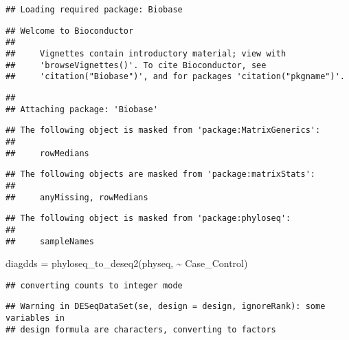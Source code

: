 \documentclass[
]{article}
\newenvironment{Shaded}{\begin{snugshade}}{\end{snugshade}}
\newcommand{\FunctionTok}[1]{\textcolor[rgb]{0.00,0.00,0.00}{#1}}
\newcommand{\NormalTok}[1]{#1}
\newcommand{\OtherTok}[1]{\textcolor[rgb]{0.56,0.35,0.01}{#1}}
\newcommand{\SpecialCharTok}[1]{\textcolor[rgb]{0.00,0.00,0.00}{#1}}
\begin{document}
\begin{verbatim}
## Loading required package: Biobase
\end{verbatim}

\begin{verbatim}
## Welcome to Bioconductor
## 
##     Vignettes contain introductory material; view with
##     'browseVignettes()'. To cite Bioconductor, see
##     'citation("Biobase")', and for packages 'citation("pkgname")'.
\end{verbatim}

\begin{verbatim}
## 
## Attaching package: 'Biobase'
\end{verbatim}

\begin{verbatim}
## The following object is masked from 'package:MatrixGenerics':
## 
##     rowMedians
\end{verbatim}

\begin{verbatim}
## The following objects are masked from 'package:matrixStats':
## 
##     anyMissing, rowMedians
\end{verbatim}

\begin{verbatim}
## The following object is masked from 'package:phyloseq':
## 
##     sampleNames
\end{verbatim}

\begin{Shaded}
\begin{Highlighting}[]
\NormalTok{diagdds }\OtherTok{=} \FunctionTok{phyloseq\_to\_deseq2}\NormalTok{(physeq, }\SpecialCharTok{\textasciitilde{}}\NormalTok{ Case\_Control)}
\end{Highlighting}
\end{Shaded}

\begin{verbatim}
## converting counts to integer mode
\end{verbatim}

\begin{verbatim}
## Warning in DESeqDataSet(se, design = design, ignoreRank): some variables in
## design formula are characters, converting to factors
\end{verbatim}
\end{document}
